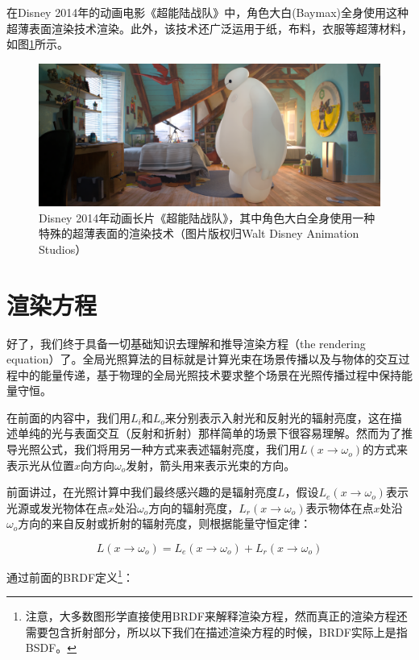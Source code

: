 在Disney 2014年的动画电影《超能陆战队》中，角色大白(Baymax)全身使用这种超薄表面渲染技术渲染。此外，该技术还广泛运用于纸，布料，衣服等超薄材料，如图\ref{f:intro-thin-baymax}所示。

\begin{figure}
	\includegraphics[width=1.\textwidth]{figures/intro/original-fullcomp-filtered}
	\caption{Disney 2014年动画长片《超能陆战队》，其中角色大白全身使用一种特殊的超薄表面的渲染技术（图片版权归Walt Disney Animation Studios）}
	\label{f:intro-thin-baymax}
\end{figure}





\section{渲染方程}\label{sec:intro-the-rendering-equation}
好了，我们终于具备一切基础知识去理解和推导渲染方程（the rendering equation）了。全局光照算法的目标就是计算光束在场景传播以及与物体的交互过程中的能量传递，基于物理的全局光照技术要求整个场景在光照传播过程中保持能量守恒。

在前面的内容中，我们用$L_i$和$L_o$来分别表示入射光和反射光的辐射亮度，这在描述单纯的光与表面交互（反射和折射）那样简单的场景下很容易理解。然而为了推导光照公式，我们将用另一种方式来表述辐射亮度，我们用$L(x\to\omega_o)$的方式来表示光从位置$x$向方向$\omega_o$发射，箭头用来表示光束的方向。

前面讲过，在光照计算中我们最终感兴趣的是辐射亮度$L$，假设$L_e(x\to\omega_o)$表示光源或发光物体在点$x$处沿$\omega_o$方向的辐射亮度，$L_r(x\to\omega_o)$表示物体在点$x$处沿$\omega_o$方向的来自反射或折射的辐射亮度，则根据能量守恒定律：

\begin{equation}
	L(x\to\omega_o)=L_e(x\to\omega_o)+L_r(x\to\omega_o)
\end{equation}

\noindent 通过前面的BRDF定义\footnote{注意，大多数图形学直接使用BRDF来解释渲染方程，然而真正的渲染方程还需要包含折射部分，所以以下我们在描述渲染方程的时候，BRDF实际上是指BSDF。}：


